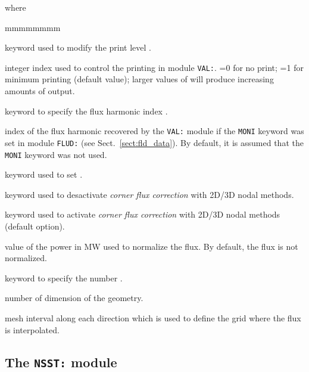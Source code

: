 \noindent where

\begin{ListeDeDescription}{mmmmmmmm}

\item[\moc{EDIT}] keyword used to modify the print level .

\item[\dusa{iprint}] integer index used to control  the printing in module {\tt VAL:}.
=0 for no print; =1 for minimum printing (default value); larger values of 
will produce increasing amounts of output.

\item[\moc{MODE}] keyword to specify the flux harmonic index .

\item[\dusa{imode}] index of the flux harmonic recovered by the {\tt VAL:} module if the {\tt MONI} keyword was set in module {\tt FLUD:}
(see Sect.~\ref{sect:fld_data}). By default, it is assumed that the {\tt MONI} keyword was not used.

\item[\moc{POWR}] keyword used to set .

\item[\moc{NOCCOR}] keyword used to desactivate {\sl corner flux correction} with 2D/3D nodal methods.

\item[\moc{CCOR}] keyword used to activate {\sl corner flux correction} with 2D/3D nodal methods (default option).

\item[\dusa{power}] value of the power in MW used to normalize the flux. By default, the flux is not normalized.

\item[\moc{DIM}] keyword to specify the number .

\item[\dusa{dim}] number of dimension of the geometry. 

\item[\dusa{dxyz}] mesh interval along each direction which is used to define the grid where the flux is interpolated. 

\end{ListeDeDescription}

\clearpage

\subsection{The {\tt NSST:} module}

